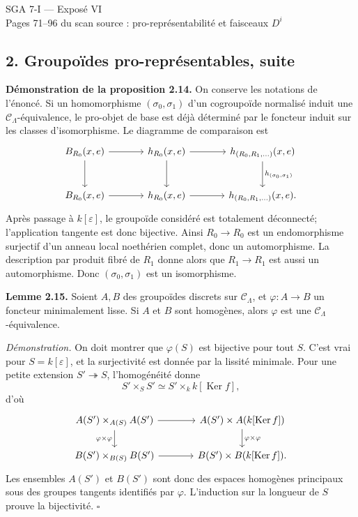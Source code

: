 \documentclass[11pt]{article}
\providecommand{\Ker}{\operatorname{Ker}}
\providecommand{\cC}{\mathcal C}
\begin{document}
\begin{center}
{\Large SGA 7-I — Exposé VI}\\[0.3em]
{\large Pages 71--96 du scan source : pro-représentabilité et faisceaux \(D^i\)}
\end{center}

\subsection*{2. Groupoïdes pro-représentables, suite}

\textbf{Démonstration de la proposition 2.14.}  On conserve les notations de l'énoncé.  Si un homomorphisme \((\sigma_0,\sigma_1)\) d'un cogroupoïde normalisé induit une \(\cC_\Lambda\)-équivalence, le pro-objet de base est déjà déterminé par le foncteur induit sur les classes d'isomorphisme.  Le diagramme de comparaison est
\[
\begin{tikzcd}[column sep=large,row sep=large]
 B_{R_0}(x,e) \arrow[r] \arrow[d] & h_{R_0}(x,e) \arrow[r] \arrow[d] & h_{(R_0,R_1,\ldots)}(x,e) \arrow[d,"h_{(\sigma_0,\sigma_1)}"] \\
 B_{R_0}(x,e) \arrow[r] & h_{R_0}(x,e) \arrow[r] & h_{(R_0,R_1,\ldots)}(x,e).
\end{tikzcd}
\]
Après passage à \(k[\varepsilon]\), le groupoïde considéré est totalement déconnecté; l'application tangente est donc bijective.  Ainsi \(R_0\to R_0\) est un endomorphisme surjectif d'un anneau local noethérien complet, donc un automorphisme.  La description par produit fibré de \(R_1\) donne alors que \(R_1\to R_1\) est aussi un automorphisme.  Donc \((\sigma_0,\sigma_1)\) est un isomorphisme.

\textbf{Lemme 2.15.}  Soient \(A,B\) des groupoïdes discrets sur \(\cC_\Lambda\), et \(\varphi:A\to B\) un foncteur minimalement lisse.  Si \(A\) et \(B\) sont homogènes, alors \(\varphi\) est une \(\cC_\Lambda\)-équivalence.

\textit{Démonstration.}  On doit montrer que \(\varphi(S)\) est bijective pour tout \(S\).  C'est vrai pour \(S=k[\varepsilon]\), et la surjectivité est donnée par la lissité minimale.  Pour une petite extension \(S'\twoheadrightarrow S\), l'homogénéité donne
\[
S'\times_SS'\simeq S'\times_k k[\Ker f],
\]
d'où
\[
\begin{tikzcd}[column sep=large]
 A(S')\times_{A(S)}A(S') \arrow[r] \arrow[d,"\varphi\times\varphi"'] & A(S')\times A(k[\Ker f]) \arrow[d,"\varphi\times\varphi"] \\
 B(S')\times_{B(S)}B(S') \arrow[r] & B(S')\times B(k[\Ker f]).
\end{tikzcd}
\]
Les ensembles \(A(S')\) et \(B(S')\) sont donc des espaces homogènes principaux sous des groupes tangents identifiés par \(\varphi\).  L'induction sur la longueur de \(S\) prouve la bijectivité. \(\square\)
\end{document}
